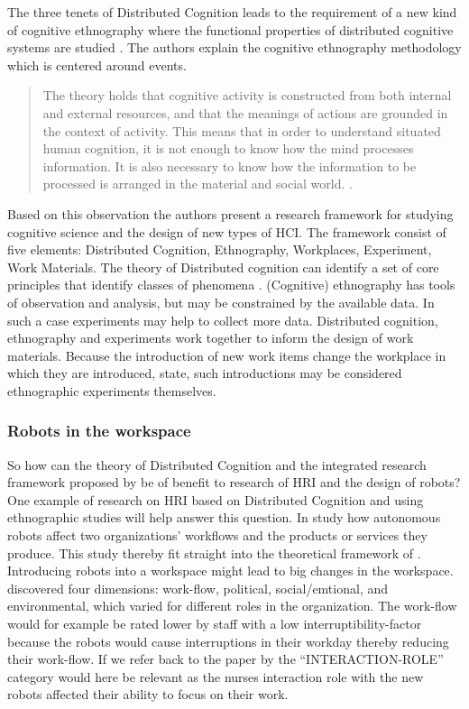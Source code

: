 The three tenets of Distributed Cognition leads to the requirement of a new kind of cognitive ethnography where the functional properties of distributed cognitive systems are studied \parencite{Hollan2000distributedcognition}. The authors explain the cognitive ethnography methodology which is centered around events.
\begin{quote}The theory holds that cognitive activity is constructed from both internal and external resources, and that the meanings of actions are grounded in the context of activity. This means that in order to understand situated human cognition, it is not enough to know how the mind processes information. It is also necessary to know how the information to be processed is arranged in the material and social world. \parencite[][179]{Hollan2000distributedcognition}.
\end{quote}
Based on this observation the authors present a research framework for studying cognitive science and the design of new types of HCI. The framework consist of five elements: Distributed Cognition, Ethnography, Workplaces, Experiment, Work Materials. The theory of Distributed cognition can identify a set of core principles that identify classes of phenomena \parencite{Hollan2000distributedcognition}. (Cognitive) ethnography has tools of observation and analysis, but may be constrained by the available data. In such a case experiments may help to collect more data. Distributed cognition, ethnography and experiments work together to inform the design of work materials. Because the introduction of new work items change the workplace in which they are introduced, \textcite{Hollan2000distributedcognition} state, such introductions may be considered ethnographic experiments themselves. 

\subsubsection{Robots in the workspace}

So how can the theory of Distributed Cognition and the integrated research framework proposed by \textcite{Hollan2000distributedcognition} be of benefit to research of HRI and the design of robots? One example of research on HRI based on Distributed Cognition and using ethnographic studies will help answer this question. In  \textcite{Forlizzi2008hri} study how autonomous robots affect two organizations' workflows and the products or services they produce. This study thereby fit straight into the theoretical framework of \parencite{Hollan2000distributedcognition}. Introducing robots into a workspace might lead to big changes in the workspace. \textcite{Forlizzi2008hri} discovered four dimensions: work-flow, political, social/emtional, and environmental, which varied for different roles in the organization. The work-flow would for example be rated lower by staff with a low interruptibility-factor because the robots would cause interruptions in their workday thereby reducing their work-flow. If we refer back to the paper by \textcite{Yanco2004robot} the ``INTERACTION-ROLE'' category would here be relevant as the nurses interaction role with the new robots affected their ability to focus on their work.

